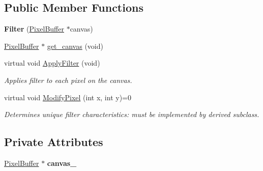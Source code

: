\subsection*{Public Member Functions}
\begin{DoxyCompactItemize}
\item 
{\bfseries Filter} (\hyperlink{classimage__tools_1_1PixelBuffer}{Pixel\+Buffer} $\ast$canvas)\hypertarget{classimage__tools_1_1Filter_a286f4487ac6f17e0263f3c8bd0072590}{}\label{classimage__tools_1_1Filter_a286f4487ac6f17e0263f3c8bd0072590}

\item 
\hyperlink{classimage__tools_1_1PixelBuffer}{Pixel\+Buffer} $\ast$ \hyperlink{classimage__tools_1_1Filter_afd9eb8f38823a6bca36115293206cf5a}{get\+\_\+canvas} (void)
\item 
virtual void \hyperlink{classimage__tools_1_1Filter_a109d756cc63f596508b3a8e02e89b4bf}{Apply\+Filter} (void)\hypertarget{classimage__tools_1_1Filter_a109d756cc63f596508b3a8e02e89b4bf}{}\label{classimage__tools_1_1Filter_a109d756cc63f596508b3a8e02e89b4bf}

\begin{DoxyCompactList}\small\item\em Applies filter to each pixel on the canvas. \end{DoxyCompactList}\item 
virtual void \hyperlink{classimage__tools_1_1Filter_a2497414e1c1e232dd4e7db2ce2ab9f74}{Modify\+Pixel} (int x, int y)=0\hypertarget{classimage__tools_1_1Filter_a2497414e1c1e232dd4e7db2ce2ab9f74}{}\label{classimage__tools_1_1Filter_a2497414e1c1e232dd4e7db2ce2ab9f74}

\begin{DoxyCompactList}\small\item\em Determines unique filter characteristics\+: must be implemented by derived subclass. \end{DoxyCompactList}\end{DoxyCompactItemize}
\subsection*{Private Attributes}
\begin{DoxyCompactItemize}
\item 
\hyperlink{classimage__tools_1_1PixelBuffer}{Pixel\+Buffer} $\ast$ {\bfseries canvas\+\_\+}\hypertarget{classimage__tools_1_1Filter_a4abab5bdc9886363c068460155f953ba}{}\label{classimage__tools_1_1Filter_a4abab5bdc9886363c068460155f953ba}

\end{DoxyCompactItemize}


